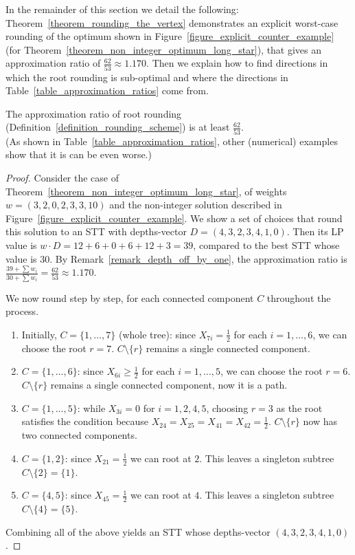 In the remainder of this section we detail the following: Theorem~\ref{theorem_rounding_the_vertex} demonstrates an explicit worst-case rounding of the optimum shown in Figure~\ref{figure_explicit_counter_example} (for Theorem~\ref{theorem_non_integer_optimum_long_star}), that gives an approximation ratio of $\frac{62}{53} \approx 1.170$. Then we explain how to find directions in which the root rounding is sub-optimal and where the directions in Table~\ref{table_approximation_ratios} come from.


\begin{theorem}
\label{theorem_rounding_the_vertex}
The approximation ratio of root rounding (Definition~\ref{definition_rounding_scheme}) is at least $\frac{62}{53}$.\\ (As shown in Table~\ref{table_approximation_ratios}, other (numerical) examples show that it is can be even worse.)
\end{theorem}

\begin{proof}
Consider the case of Theorem~\ref{theorem_non_integer_optimum_long_star}, of weights $w = (3,2,0,2,3,3,10)$ and the non-integer solution described in Figure~\ref{figure_explicit_counter_example}. We show a set of choices that round this solution to an STT with depths-vector $D = (4, 3, 2, 3, 4, 1, 0)$. Then its LP value is $w \cdot D = 12+6+0+6+12+3 = 39$, compared to the best STT whose value is $30$. By Remark~\ref{remark_depth_off_by_one}, the approximation ratio is $\frac{39 + \sum{w_i}}{30 + \sum{w_i}} = \frac{62}{53} \approx 1.170$.

We now round step by step, for each connected component $C$ throughout the process.
\begin{enumerate}
    \item Initially, $C = \{1,\ldots,7\}$ (whole tree): since $X_{7i} = \frac{1}{2}$ for each $i=1,\ldots,6$, we can choose the root $r=7$. $C \setminus \{r\}$ remains a single connected component.

    \item $C = \{1,\ldots,6\}$: since $X_{6i} \ge \frac{1}{2}$ for each $i=1,\ldots,5$, we can choose the root $r=6$. $C \setminus \{r\}$ remains a single connected component, now it is a path.

    \item $C = \{1,\ldots,5\}$: while $X_{3i} = 0$ for $i=1,2,4,5$, choosing $r=3$ as the root satisfies the condition because $X_{24}=X_{25}=X_{41}=X_{42}=\frac{1}{2}$. $C \setminus \{r\}$ now has two connected components.

    \item $C = \{1,2\}$: since $X_{21} = \frac{1}{2}$ we can root at $2$. This leaves a singleton subtree $C \setminus \{2\} = \{ 1 \}$.

    \item $C = \{4,5\}$: since $X_{45} = \frac{1}{2}$ we can root at $4$. This leaves a singleton subtree $C \setminus \{4\} = \{ 5 \}$.
\end{enumerate}
Combining all of the above yields an STT whose  depths-vector $(4, 3, 2, 3, 4, 1, 0)$.
\end{proof}

